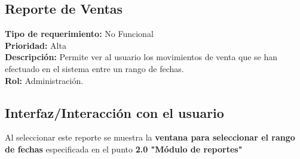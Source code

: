 \documentclass[a4paper,DIV=12]{scrreprt}
\begin{document}
\subsection{Reporte de Ventas}
\noindent
\textbf{Tipo de requerimiento:} No Funcional \\
\textbf{Prioridad:} Alta\\
\textbf{Descripción:}
Permite ver al usuario los movimientos de venta que se han efectuado en el sistema entre un rango de fechas.\\
\textbf{Rol:} Administración.
\subsection*{Interfaz/Interacción con el usuario}
Al seleccionar este reporte se muestra la \textbf{ventana para seleccionar el rango de fechas} especificada en el punto \textbf{2.0 "Módulo de reportes"}
\end{document}
